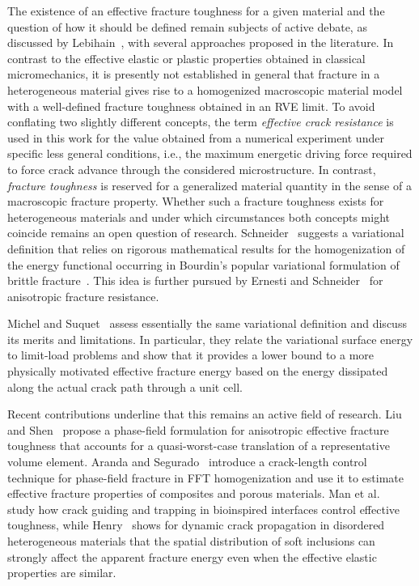 \documentclass[pdflatex,sn-mathphys-num]{sn-jnl}%
\theoremstyle{thmstyleone}%
\theoremstyle{thmstyletwo}%
\theoremstyle{thmstylethree}%
\begin{document}
The existence of an effective fracture toughness for a given material
and the question of how it should be defined remain subjects
of active debate, as discussed by Lebihain~\cite{lebihain_brittle_2021},
with several approaches proposed in the literature.
In contrast to the effective elastic or plastic properties obtained in classical micromechanics, it is presently not established in general that fracture in a heterogeneous material gives rise to a homogenized macroscopic material model with a well-defined fracture toughness obtained in an RVE limit.
To avoid conflating two slightly different concepts, the term \textsl{effective crack resistance} is used in this work for the value obtained from a numerical experiment under specific less general conditions, i.e., the maximum energetic driving force required to force crack advance through the considered microstructure. In contrast, \textsl{fracture toughness} is reserved for a generalized material quantity in the sense of a macroscopic fracture property. Whether such a fracture toughness exists for heterogeneous materials and under which circumstances both concepts might coincide remains an open question of research.
Schneider~\cite{schneider_fftbased_2020} suggests a variational definition that
relies on rigorous mathematical results for the homogenization of
the energy functional occurring in Bourdin's popular variational formulation of brittle fracture~\cite{bourdin_variational_2008}.
This idea is further pursued by
Ernesti and Schneider~\cite{ernesti_fast_2021,ernesti_computing_2022} for anisotropic fracture resistance.

Michel and Suquet~\cite{michel_merits_2022} 
assess essentially the same variational definition and discuss its merits and limitations. In particular, they relate the variational surface energy to limit-load problems and show that it provides a lower bound to a more physically motivated effective fracture energy based on the energy dissipated along the actual crack path through a unit cell.

Recent contributions underline that this remains an active field of research. Liu and Shen~\cite{liu_effective_2025} propose a phase-field formulation for anisotropic effective fracture toughness that accounts for a quasi-worst-case translation of a representative volume element. Aranda and Segurado~\cite{aranda_cracklength_2025} introduce a crack-length control technique for phase-field fracture in FFT homogenization and use it to estimate effective fracture properties of composites and porous materials. Man et al.~\cite{man_collaborative_2025} study how crack guiding and trapping in bioinspired interfaces control effective toughness, while Henry~\cite{henry_phasefield_2025} shows for dynamic crack propagation in disordered heterogeneous materials that the spatial distribution of soft inclusions can strongly affect the apparent fracture energy even when the effective elastic properties are similar.
\end{document}
